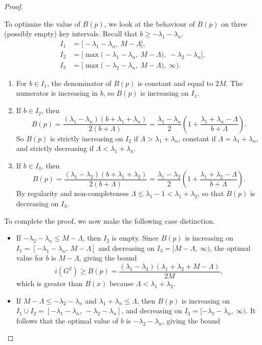 \documentclass[a4paper,11pt]{article}
\theoremstyle{definition}
\begin{document}
\begin{proof}
\begin{itemize}
    To optimize the value of $B(p)$, we look at the behaviour of $B(p)$ on three (possibly empty) key intervals. Recall that $b \ge -\lambda_1-\lambda_n$.
    \begin{align*}
        I_1 &= \Big[-\lambda_1-\lambda_n,\ M-\Lambda\Big ],\\
        I_2 &= \Big [\max\big(-\lambda_1-\lambda_n,\ M-\Lambda\big),\ -\lambda_2-\lambda_n\Big ],\\
        I_3 &= \Big [ \max\big(-\lambda_2-
        \lambda_n,\ M-\Lambda\big),\ \infty \Big ).
    \end{align*}
    \begin{enumerate}
    \item For $b\in I_1$, the denominator of $B(p)$ is constant and equal to $2M$. The numerator is increasing in $b$, so $B(p)$ is increasing on $I_1$.
    \item If $b\in I_2$, then
    $$B(p)=\frac{(\lambda_1-\lambda_n)(b+\lambda_1+\lambda_n)}{2(b+\Lambda)}=\frac{\lambda_1-\lambda_n}{2}\left (1+\frac{\lambda_1+\lambda_n-\Lambda}{b+\Lambda}\right ).$$
    So $B(p)$ is strictly increasing on $I_2$ if $\Lambda>\lambda_1+\lambda_n$, constant if $\Lambda=\lambda_1+\lambda_n$, and strictly decreasing if $\Lambda< \lambda_1+\lambda_n$.
    \item If $b\in I_3$, then
    $$B(p)=\frac{(\lambda_1-\lambda_2)(b+\lambda_1+\lambda_2)}{2(b+\Lambda)}=\frac{\lambda_1-\lambda_2}2 \left (1+\frac{\lambda_1+\lambda_2-\Lambda}{b+\Lambda} \right).$$
    By regularity and non-completeness $\Lambda\le \lambda_1-1<\lambda_1+\lambda_2$, so that $B(p)$ is decreasing on $I_3$.
    \end{enumerate}
    To complete the proof, we now make the following case distinction.
    \begin{itemize}
        \item If $-\lambda_2-\lambda_n \le M-\Lambda$, then $I_2$ is empty. Since $B(p)$ is increasing on $I_1=[-\lambda_1-\lambda_n,\ M-\Lambda]$ and decreasing on $I_3=[M-\Lambda,\ \infty)$, the optimal value for $b$ is $M-\Lambda$, giving the bound
        $$i(G^2)\ge B(p) = \frac{(\lambda_1-\lambda_2)(\lambda_1+\lambda_2+M-\Lambda)}{2M},$$
        which is greater than $B(x)$ because $\Lambda <\lambda_1+\lambda_2$.
            \item If $M-\Lambda\le -\lambda_2-\lambda_n$ and $\lambda_1+\lambda_n \le \Lambda$, then $B(p)$ is increasing on $I_1\cup I_2=[-\lambda_1-\lambda_n,\ -\lambda_2-\lambda_n]$, and decreasing on $I_3=[-\lambda_2-\lambda_n,\ \infty)$. It follows that the optimal value of $b$ is $-\lambda_2-\lambda_n$, giving the bound

\end{itemize}
\end{itemize}
\end{proof}
\end{document}
